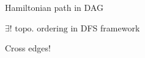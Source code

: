 \begin{frame}{Hamiltonian path in DAG}
  \centerline{$\exists! \text{ topo. ordering}$ in DFS framework}

  \vspace{0.50cm}

  \centerline{Cross edges!}
\end{frame}
